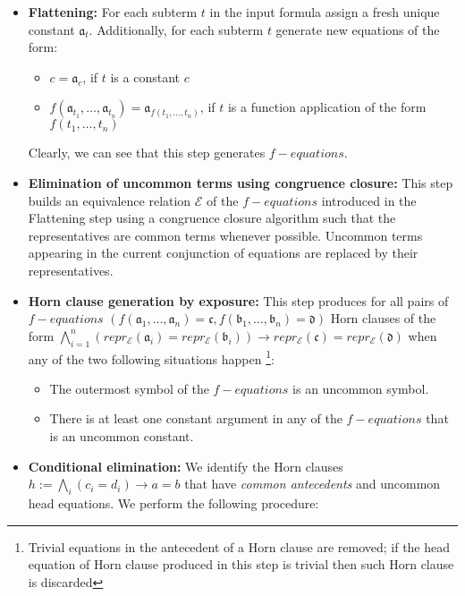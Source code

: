 \begin{itemize}
  \item \textbf{Flattening:} 
    For each subterm $t$ in the input formula assign a fresh unique constant $\mathfrak{a}_t$. 
    Additionally, for each subterm $t$ generate new equations of the form:
    \begin{itemize}
      \item $c = \mathfrak{a}_c$, if $t$ is a constant $c$
      \item $f(\mathfrak{a}_{t_1}, \dots, \mathfrak{a}_{t_n}) 
        = \mathfrak{a}_{f(t_1, \dots, t_n)}$, if $t$ is a 
        function application of the form $f(t_1, \dots, t_n)$
    \end{itemize}
    Clearly, we can see that this step generates $f-equations$.
  \item \textbf{Elimination of uncommon terms using congruence closure:}
    This step builds an equivalence 
    relation $\mathcal{E}$ of the $f-equations$ introduced in the 
    Flattening step using a congruence closure algorithm such 
    that the representatives are common terms
    whenever possible. Uncommon terms appearing in the current conjunction of 
    equations are replaced by their representatives.
  \item \textbf{Horn clause generation by exposure:} 
    This step produces for all pairs of $f-equations$ 
    $(f(\mathfrak{a}_1, \dots, \mathfrak{a}_n) = \mathfrak{c}, 
    f(\mathfrak{b}_1, \dots, \mathfrak{b}_n) = \mathfrak{d})$
    Horn clauses of the form 
    $\bigwedge_{i=1}^n(repr_{\mathcal{E}}(\mathfrak{a}_i) = repr_{\mathcal{E}}(\mathfrak{b}_i))
    \rightarrow repr_{\mathcal{E}}(\mathfrak{c}) = repr_{\mathcal{E}}(\mathfrak{d})$
    when any of the two following situations happen \footnote{Trivial equations in the antecedent
    of a Horn clause are removed; if the head equation of Horn clause produced in this 
    step is trivial then such Horn clause is discarded}:
    \begin{itemize}
      \item The outermost symbol of the $f-equations$ is an uncommon symbol.
      \item There is at least one constant argument in any of the $f-equations$ 
        that is an uncommon constant.
    \end{itemize}
  \item \textbf{Conditional elimination:} 
    We identify the Horn clauses $h := \bigwedge_i (c_i = d_i) \rightarrow a = b$
    that have \emph{common antecedents} and uncommon head equations. 
    We perform the following procedure: 


\end{itemize}
